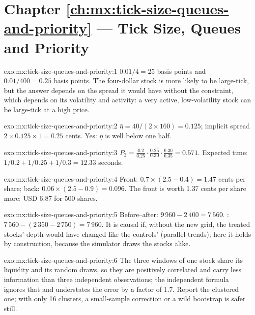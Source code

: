 \section*{Chapter \ref{ch:mx:tick-size-queues-and-priority} --- Tick Size, Queues and Priority}

\begin{solution}{exo:mx:tick-size-queues-and-priority:1}
$0.01/4=25$ basis points and $0.01/400=0.25$ basis points. The four-dollar stock is more likely to be large-tick, but the answer depends on the spread it
would have without the constraint, which depends on its volatility and activity: a very active, low-volatility stock can be large-tick at a high price.
\end{solution}

\begin{solution}{exo:mx:tick-size-queues-and-priority:2}
$\hat\eta=40/(2\times160)=0.125$; implicit spread $2\times0.125\times1=0.25$ cents. Yes: $\eta$ is well below one half.
\end{solution}

\begin{solution}{exo:mx:tick-size-queues-and-priority:3}
$P_2=\tfrac{0.2}{0.25}\cdot\tfrac{0.25}{0.30}\cdot\tfrac{0.30}{0.35}=0.571$. Expected time: $1/0.2+1/0.25+1/0.3=12.33$ seconds.
\end{solution}

\begin{solution}{exo:mx:tick-size-queues-and-priority:4}
Front: $0.7\times(2.5-0.4)=1.47$ cents per share; back: $0.06\times(2.5-0.9)=0.096$. The front is worth 1.37 cents per share more: USD 6.87 for 500
shares.
\end{solution}

\begin{solution}{exo:mx:tick-size-queues-and-priority:5}
Before--after: $9\,960-2\,400=7\,560$. : $7\,560-(2\,350-2\,750)=7\,960$. It is causal if, without the new grid, the treated
stocks' depth would have changed like the controls' (parallel trends); here it holds by construction, because the simulator draws the stocks alike.
\end{solution}

\begin{solution}{exo:mx:tick-size-queues-and-priority:6}
The three windows of one stock share its liquidity and its random draws, so they are positively correlated and carry less information than three
independent observations; the independent formula ignores that and understates the error by a factor of 1.7. Report the clustered one; with only 16
clusters, a small-sample correction or a wild bootstrap is safer still.
\end{solution}

